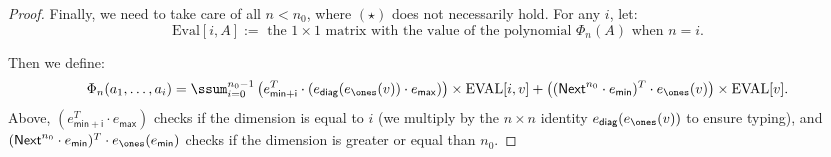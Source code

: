 \begin{proof}
Finally, we need to take care of all $n<n_0$, where $(\star)$ does not necessarily hold. For any $i$, let: $$\text{Eval}[i,A]:= \text{ the } 1\times 1 \text{ matrix with the value of the polynomial } \Phi_n(A) \text{ when } n=i.$$

Then we define: 
$$
\Phi_n(a_1,\ldots, a_i)=\ssum_{i=0}^{n_0-1}\left( e_{\mathsf{min}+\mathsf{i}}^T\cdot (e_{\mathsf{diag}}(e_{\ones}(v))\cdot e_{\mathsf{max}}) \right) \times \text{EVAL}[i,v] + \left( (\mathsf{Next}^{n_0}\cdot e_{\mathsf{min}})^T\cdot e_{\ones} (v) \right)\times \text{EVAL}[v].
$$ 
Above, $(e_{\mathsf{min}+\mathsf{i}}^T\cdot e_{\mathsf{max}})$ checks if the dimension is equal to $i$ (we multiply
by the $n\times n$ identity $e_{\mathsf{diag}}(e_{\ones}(v))$ to ensure typing), 
and $(\mathsf{Next}^{n_0}\cdot e_{\mathsf{min}})^T\cdot e_{\ones} (e_{\mathsf{min}})$ checks if the 
dimension is greater or equal than $n_0$.

\end{proof}